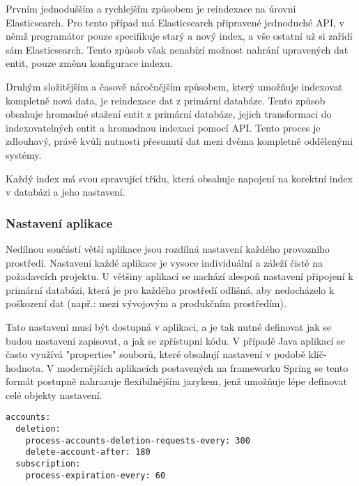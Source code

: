 		Prvním jednodušším a rychlejším způsobem je reindexace na úrovni Elasticsearch.
		Pro tento případ má Elasticsearch připravené jednoduché \ac{API}, v němž programátor pouze specifikuje starý a nový
		index, a vše ostatní už si zařídí sám Elasticsearch.
		Tento způsob však nenabízí možnost nahrání upravených dat entit, pouze změnu konfigurace indexu.


		Druhým složitějším a časově náročnějším způsobem, který umožňuje indexovat kompletně nová data, je
		reindexace dat z primární databáze.
		Tento způsob obsahuje hromadné stažení entit z primární databáze, jejich transformaci do indexovatelných entit
		a hromadnou indexaci pomocí \ac{API}.
		Tento proces je zdlouhavý, právě kvůli nutnosti přesunutí dat mezi dvěma kompletně oddělenými systémy.


		Každý index má svou spravující třídu, která obsahuje napojení na korektní index v databázi a jeho nastavení.

		\subsubsection{Nastavení aplikace}

		Nedílnou součástí větší aplikace jsou rozdílná nastavení každého provozního prostředí.
		Nastavení každé aplikace je vysoce individuální a záleží čistě na požadavcích projektu.
		U většiny aplikací se nachází alespoň nastavení připojení k primární databázi, která je pro každého prostředí
		odlišná, aby nedocházelo k poškození dat (např.: mezi vývojovým a produkčním prostředím).

		Tato nastavení musí být dostupná v aplikaci, a je tak nutné definovat jak se budou nastavení zapisovat, a jak se
		zpřístupní kódu.
		V případě Java aplikací se často využívá "properties" souborů, které obsahují nastavení v podobě klíč-hodnota.
		V modernějších aplikacích postavených na frameworku Spring se tento formát postupně nahrazuje flexibilnějším
		 jazykem, jenž umožňuje lépe definovat celé objekty nastavení.

		\newpage

		\begin{codeblock}
			\begin{verbatim}
accounts:
  deletion:
    process-accounts-deletion-requests-every: 300
    delete-account-after: 180
  subscription:
    process-expiration-every: 60
			\end{verbatim}
		\end{codeblock}

